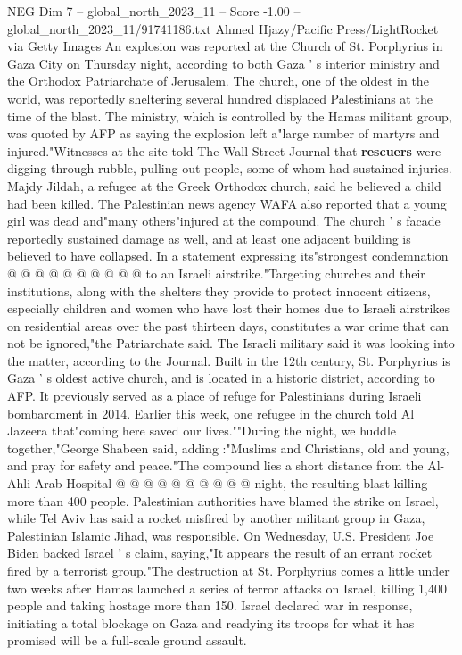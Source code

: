 \begin{textsample}{NEG Dim 7 – global\_north\_2023\_11 – Score -1.00 – global\_north\_2023\_11/91741186.txt}  \label{ex:f7_neg_323}
Ahmed Hjazy/Pacific Press/LightRocket via Getty Images An explosion was reported at the Church of St.
Porphyrius in Gaza City on Thursday night, according to both Gaza ' s interior ministry and the Orthodox Patriarchate of Jerusalem.
The church, one of the oldest in the world, was reportedly sheltering several hundred displaced Palestinians at the time of the blast.
The ministry, which is controlled by the Hamas militant group, was quoted by AFP as saying the explosion left a"large number of martyrs and injured."Witnesses at the site told The Wall Street Journal that \textbf{rescuers} were digging through rubble, pulling out people, some of whom had sustained injuries.
Majdy Jildah, a refugee at the Greek Orthodox church, said he believed a child had been killed.
The Palestinian news agency WAFA also reported that a young girl was dead and"many others"injured at the compound.
The church ' s facade reportedly sustained damage as well, and at least one adjacent building is believed to have collapsed.
In a statement expressing its"strongest condemnation @ @ @ @ @ @ @ @ @ @ to an Israeli airstrike."Targeting churches and their institutions, along with the shelters they provide to protect innocent citizens, especially children and women who have lost their homes due to Israeli airstrikes on residential areas over the past thirteen days, constitutes a war crime that can not be ignored,"the Patriarchate said.
The Israeli military said it was looking into the matter, according to the Journal.
Built in the 12th century, St.
Porphyrius is Gaza ' s oldest active church, and is located in a historic district, according to AFP.
It previously served as a place of refuge for Palestinians during Israeli bombardment in 2014.
Earlier this week, one refugee in the church told Al Jazeera that"coming here saved our lives.""During the night, we huddle together,"George Shabeen said, adding :"Muslims and Christians, old and young, and pray for safety and peace."The compound lies a short distance from the Al-Ahli Arab Hospital @ @ @ @ @ @ @ @ @ @ night, the resulting blast killing more than 400 people.
Palestinian authorities have blamed the strike on Israel, while Tel Aviv has said a rocket misfired by another militant group in Gaza, Palestinian Islamic Jihad, was responsible.
On Wednesday, U.S.
President Joe Biden backed Israel ' s claim, saying,"It appears the result of an errant rocket fired by a terrorist group."The destruction at St.
Porphyrius comes a little under two weeks after Hamas launched a series of terror attacks on Israel, killing 1,400 people and taking hostage more than 150.
Israel declared war in response, initiating a total blockage on Gaza and readying its troops for what it has promised will be a full-scale ground assault.

\end{textsample}
